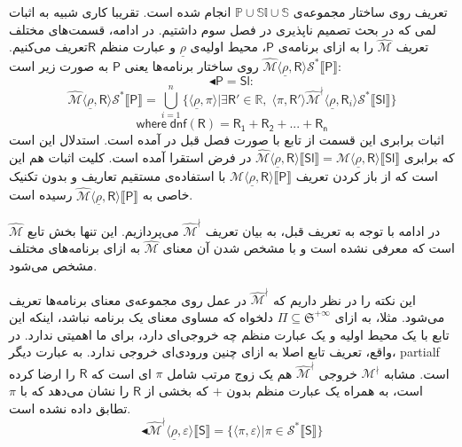 تعریف روی ساختار مجموعه‌ی 
$\mathbb{P \cup Sl \cup S}$
انجام شده است. تقریبا کاری شبیه به اثبات لمی که در بحث تصمیم ناپذیری در فصل سوم داشتیم.
در ادامه، قسمت‌های مختلف تعریف $\mathcal{\hat{M}}$ را به ازای برنامه‌ی $\mathsf{P}$، محیط اولیه‌ی $\underline{\rho}$ و عبارت منظم $\mathsf{R}$تعریف می‌کنیم.
$\mathcal{\hat{M}} \langle \underline{\rho} , \mathsf{R} \rangle \mathcal{S}^* 
\llbracket \mathsf{P} \rrbracket$
 روی ساختار برنامه‌ها یعنی $\mathsf{P}$ به صورت زیر است:
$$\blacktriangleleft \mathsf{P=Sl:}$$
$$\mathcal{\hat{M}} \langle \underline{\rho} , \mathsf{R} \rangle \mathcal{S}^* \llbracket \mathsf{P} \rrbracket=
\bigcup_{i=1}^n \{\langle \underline{\rho} , \pi \rangle | \exists \mathsf{R'} \in \mathbb{R}, \; \langle \pi , \mathsf{R'} \rangle \mathcal{\hat{M}^\nmid}
\langle \underline{\rho}, \mathsf{R}_i \rangle \mathcal{S}^* \llbracket \mathsf{Sl} \rrbracket \}
$$  
$$\mathsf{where\; dnf(R)=R_1 + R_2 + ... + R_n}$$
اثبات برابری این قسمت از تابع با صورت فصل قبل در \cite{calcul} آمده است. استدلال این است که برابری 
$\mathcal{\hat{M}} \langle \underline{\rho}, \mathsf{R} \rangle \llbracket \mathsf{Sl} \rrbracket=
\mathcal{{M}} \langle \underline{\rho}, \mathsf{R} \rangle \llbracket \mathsf{Sl} \rrbracket$
در فرض استقرا آمده است. کلیت اثبات هم این است که از باز کردن تعریف
$\mathcal{{M}} \langle \underline{\rho}, \mathsf{R} \rangle \llbracket \mathsf{P} \rrbracket$
با استفاده‌ی مستقیم تعاریف و بدون تکنیک خاصی به 
$\mathcal{\hat{M}} \langle \underline{\rho}, \mathsf{R} \rangle \llbracket \mathsf{P} \rrbracket$
رسیده است.

در ادامه با توجه به تعریف قبل، به بیان تعریف 
$\mathcal{\hat{M}^\nmid}$
می‌پردازیم. این تنها بخش تابع $\mathcal{\hat{M}}$ است که معرفی نشده است و با مشخص شدن آن معنای 
$\mathcal{\hat{M}}$
به ازای برنامه‌های مختلف مشخص می‌شود. 

این نکته را در نظر داریم که 
$\mathcal{\hat{M}^\nmid}$
در عمل روی مجموعه‌ی معنای برنامه‌ها تعریف می‌شود. مثلا، به ازای  
$\Pi \subseteq \mathfrak{S}^{+\infty}$
دلخواه که مساوی معنای یک برنامه نباشد، اینکه این تابع با یک محیط اولیه و یک عبارت منظم چه خروجی‌ای دارد، برای ما اهمیتی ندارد. در واقع، تعریف تابع اصلا به ازای چنین ورودی‌ای خروجی ندارد. به عبارت دیگر، \gls*{partialf} است. مشابه 
$\mathcal{M^\nmid}$
خروجی 
$\mathcal{\hat{M}^\nmid}$
هم یک زوج مرتب شامل $\pi$ ای است که $\mathsf{R}$ را ارضا کرده است، به همراه یک عبارت منظم بدون $+$ که بخشی از $\mathsf{R}$ را نشان می‌دهد که با $\pi$ تطابق داده نشده است.
$$\blacktriangleleft\mathcal{\hat{M}^\nmid} \langle \underline{\rho}, \mathsf{\varepsilon} \rangle \llbracket \mathsf{S} \rrbracket
=
\{\langle \pi , \varepsilon \rangle | \pi \in \mathcal{S}^* \llbracket \mathsf{S} \rrbracket \}$$

